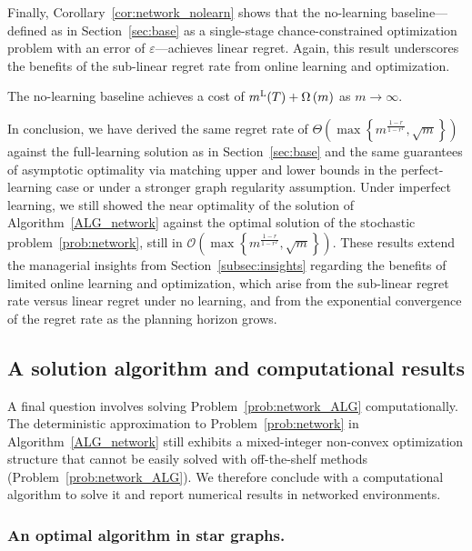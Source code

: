 \documentclass[nonblindrev]{informs3noheader}
\def\calO{\mathcal{O}}
\begin{document}
Finally, Corollary~\ref{cor:network_nolearn} shows that the no-learning baseline---defined as in Section~\ref{sec:base} as a single-stage chance-constrained optimization problem with an error of $\varepsilon$---achieves linear regret. Again, this result underscores the benefits of the sub-linear regret rate from online learning and optimization.
\begin{corollary}\label{cor:network_nolearn}
    The no-learning baseline achieves a cost of $m^{\textsc{L}}(T)+\Omega\left(m\right)$ as $m \to \infty$.
\end{corollary}

In conclusion, we have derived the same regret rate of $\Theta\left(\max\left\{m^{\frac{1-r}{1-r^T}},\sqrt{m}\right\}\right)$ against the full-learning solution as in Section~\ref{sec:base} and the same guarantees of asymptotic optimality via matching upper and lower bounds in the perfect-learning case or under a stronger graph regularity assumption. Under imperfect learning, we still showed the near optimality of the solution of Algorithm~\ref{ALG_network} against the optimal solution of the stochastic problem~\eqref{prob:network}, still in $\calO\left(\max\left\{m^{\frac{1-r}{1-r^T}},\sqrt{m}\right\}\right)$. These results extend the managerial insights from Section~\ref{subsec:insights} regarding the benefits of limited online learning and optimization, which arise from the sub-linear regret rate versus linear regret under no learning, and from the exponential convergence of the regret rate as the planning horizon grows.

\subsection{A solution algorithm and computational results}
\label{subsec:solution}

A final question involves solving Problem~\eqref{prob:network_ALG} computationally. The deterministic approximation to Problem~\eqref{prob:network} in Algorithm~\ref{ALG_network} still exhibits a mixed-integer non-convex optimization structure that cannot be easily solved with off-the-shelf methods (Problem~\eqref{prob:network_ALG}). We therefore conclude with a computational algorithm to solve it and report numerical results in networked environments.

\subsubsection*{An optimal algorithm in star graphs.}
\end{document}
